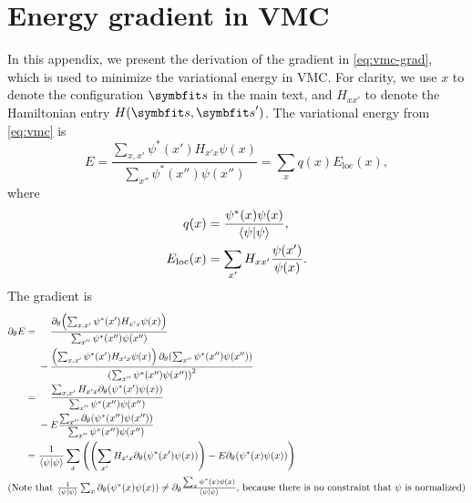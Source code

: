 \appendix

\newcommand{\pp}{\partial}

\chapter{Energy gradient in VMC}
\label{append:vmc-grad}

In this appendix, we present the derivation of the gradient in \cref{eq:vmc-grad}, which is used to minimize the variational energy in VMC. For clarity, we use $x$ to denote the configuration $\vs$ in the main text, and $H_{x x'}$ to denote the Hamiltonian entry $H(\vs, \vs')$. The variational energy from \cref{eq:vmc} is
\begin{equation}
E = \frac{\sum_{x, x'} \psi^*(x') H_{x' x} \psi(x)}{\sum_{x''} \psi^*(x'') \psi(x'')}
= \sum_x q(x) E_\text{loc}(x),
\end{equation}
where
\begin{align}
q(x) &= \frac{\psi^*(x) \psi(x)}{\ip{\psi}}, \\
E_\text{loc}(x) &= \sum_{x'} H_{x x'} \frac{\psi(x')}{\psi(x)}.
\end{align}
The gradient is
\begin{align}
\pp_\theta E &= \phantom{{}-{}}\frac{\pp_\theta\!\left( \sum_{x, x'} \psi^*(x') H_{x' x} \psi(x) \right)}{\sum_{x''} \psi^*(x'') \psi(x'')} \nonumber \\
&\phantom{{}={}}- \frac{\left( \sum_{x, x'} \psi^*(x') H_{x' x} \psi(x) \right) \pp_\theta\!\left( \sum_{x''} \psi^*(x'') \psi(x'') \right)}{\left( \sum_{x''} \psi^*(x'') \psi(x'') \right)^2} \\
&= \phantom{{}-{}}\frac{\sum_{x, x'} H_{x' x} \pp_\theta\!\left( \psi^*(x') \psi(x) \right)}{\sum_{x''} \psi^*(x'') \psi(x'')} \nonumber \\
&\phantom{{}={}}- E \frac{\sum_{x''} \pp_\theta\!\left( \psi^*(x'') \psi(x'') \right)}{\sum_{x''} \psi^*(x'') \psi(x'')} \\
&= \frac{1}{\ip{\psi}} \sum_x \left( \left( \sum_{x'} H_{x' x} \pp_\theta\!\left( \psi^*(x') \psi(x) \right) \right) - E \pp_\theta\!\left( \psi^*(x) \psi(x) \right) \right) \\
\intertext{(Note that $\frac{1}{\ip{\psi}} \sum_x \pp_\theta\!\left( \psi^*(x) \psi(x) \right) \neq \pp_\theta \frac{\sum_x \psi^*(x) \psi(x)}{\ip{\psi}}$, because there is no constraint that $\psi$ is normalized)} \nonumber
\end{align}

